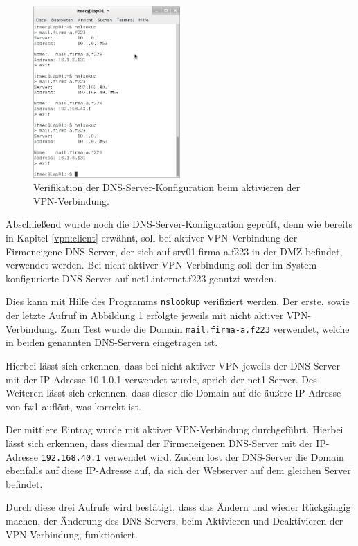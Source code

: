 \begin{figure}[h!]
  \centering
    \includegraphics[width=0.5\textwidth]{figures/vpn_nslookup.png}
  \caption{Verifikation der DNS-Server-Konfiguration beim aktivieren der VPN-Verbindung.}
  \label{vpn:lap01_nslookup}
\end{figure}

Abschließend wurde noch die DNS-Server-Konfiguration geprüft, denn wie bereits in Kapitel \ref{vpn:client} erwähnt, soll bei aktiver VPN-Verbindung der Firmeneigene DNS-Server, der sich auf srv01.firma-a.f223 in der DMZ befindet, verwendet werden. Bei nicht aktiver VPN-Verbindung soll der im System konfigurierte DNS-Server auf net1.internet.f223 genutzt werden.

Dies kann mit Hilfe des Programms \texttt{nslookup} verifiziert werden. Der erste, sowie der letzte Aufruf in Abbildung \ref{vpn:lap01_nslookup} erfolgte jeweils mit nicht aktiver VPN-Verbindung. Zum Test wurde die Domain \texttt{mail.firma-a.f223} verwendet, welche in beiden genannten DNS-Servern eingetragen ist.

Hierbei lässt sich erkennen, dass bei nicht aktiver VPN jeweils der DNS-Server mit der IP-Adresse 10.1.0.1 verwendet wurde, sprich der net1 Server. Des Weiteren lässt sich erkennen, dass dieser die Domain auf die äußere IP-Adresse von fw1 auflöst, was korrekt ist.

Der mittlere Eintrag wurde mit aktiver VPN-Verbindung durchgeführt. Hierbei lässt sich erkennen, dass diesmal der Firmeneigenen DNS-Server mit der IP-Adresse \texttt{192.168.40.1} verwendet wird. Zudem löst der DNS-Server die Domain ebenfalls auf diese IP-Adresse auf, da sich der Webserver auf dem gleichen Server befindet.

Durch diese drei Aufrufe wird bestätigt, dass das Ändern und wieder Rückgängig machen, der Änderung des DNS-Servers, beim Aktivieren und Deaktivieren der VPN-Verbindung, funktioniert.
